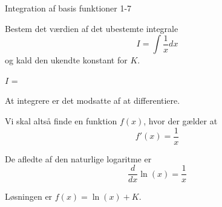 \documentclass{article}
\begin{document}
\begin{exercise}{Integration af basis funktioner 1-7}

Bestem det værdien af det ubestemte integrale
\[
I = \int \frac{1}{x} dx
\]
og kald den ukendte konstant for $K$.

$I$ =  

\hint
At integrere er det modsatte af at differentiere.

\hint
Vi skal altså finde en funktion $f(x)$, hvor der gælder at
\[
f'(x) = \frac{1}{x}
\]

\hint
De afledte af den naturlige logaritme er
\[
\frac{d}{dx} \ln(x) = \frac{1}{x}
\]


\hint
Løsningen er $f(x) = \ln(x) + K$.

\end{exercise}
\end{document}
